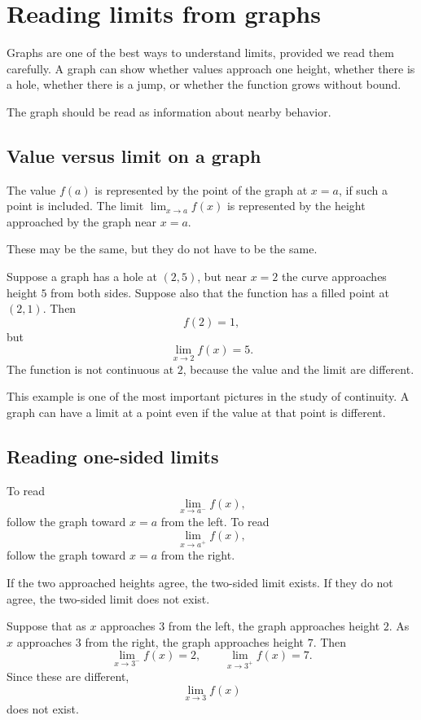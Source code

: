\section{Reading limits from graphs}

Graphs are one of the best ways to understand limits, provided we read them carefully. A graph can show whether values approach one height, whether there is a hole, whether there is a jump, or whether the function grows without bound.

The graph should be read as information about nearby behavior.

\subsection*{Value versus limit on a graph}

The value \(f(a)\) is represented by the point of the graph at \(x=a\), if such a point is included. The limit \(\lim_{x\to a}f(x)\) is represented by the height approached by the graph near \(x=a\).

These may be the same, but they do not have to be the same.

\begin{examplebox}
Suppose a graph has a hole at \((2,5)\), but near \(x=2\) the curve approaches height \(5\) from both sides. Suppose also that the function has a filled point at \((2,1)\). Then
\[
f(2)=1,
\]
but
\[
\lim_{x\to2}f(x)=5.
\]
The function is not continuous at \(2\), because the value and the limit are different.
\end{examplebox}

This example is one of the most important pictures in the study of continuity. A graph can have a limit at a point even if the value at that point is different.

\subsection*{Reading one-sided limits}

To read
\[
\lim_{x\to a^-}f(x),
\]
follow the graph toward \(x=a\) from the left. To read
\[
\lim_{x\to a^+}f(x),
\]
follow the graph toward \(x=a\) from the right.

If the two approached heights agree, the two-sided limit exists. If they do not agree, the two-sided limit does not exist.

\begin{examplebox}
Suppose that as \(x\) approaches \(3\) from the left, the graph approaches height \(2\). As \(x\) approaches \(3\) from the right, the graph approaches height \(7\). Then
\[
\lim_{x\to3^-}f(x)=2,
\qquad
\lim_{x\to3^+}f(x)=7.
\]
Since these are different,
\[
\lim_{x\to3}f(x)
\]
does not exist.
\end{examplebox}

